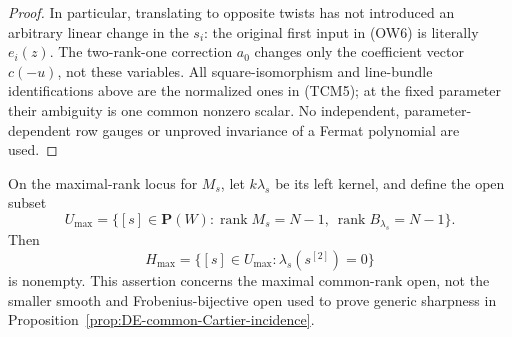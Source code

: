 \begin{proof}
In particular, translating to opposite twists has not introduced an
arbitrary linear change in the \(s_i\): the original first input in
(OW6) is literally \(e_i(z)\).  The two-rank-one correction \(a_0\)
changes only the coefficient vector \(c(-u)\), not these variables.
All square-isomorphism and line-bundle identifications above are the
normalized ones in (TCM5); at the fixed parameter their ambiguity is
one common nonzero scalar.  No independent, parameter-dependent row
gauges or unproved invariance of a Fermat polynomial are used.
\end{proof}

\begin{proposition}
\label{prop:odd-cover-common-rank-wall-nonempty}
On the maximal-rank locus for \(M_s\), let \(k\lambda_s\) be its left
kernel, and define the open subset
\[
 U_{\max}=\{[s]\in\mathbf P(W):
      \operatorname{rank}M_s=N-1,\
      \operatorname{rank}B_{\lambda_s}=N-1\}.
 \tag{OW8}
\]
Then
\[
 H_{\max}=\{[s]\in U_{\max}:\lambda_s(s^{[2]})=0\}
 \tag{OW9}
\]
is nonempty.  This assertion concerns the maximal common-rank open,
not the smaller smooth and Frobenius-bijective open used to prove
generic sharpness in Proposition~\ref{prop:DE-common-Cartier-incidence}.
\end{proposition}
